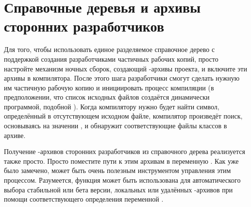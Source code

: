 \section{Справочные деревья и архивы сторонних %
разработчиков}

Для того, чтобы использовать единое разделяемое справочное дерево с
поддержкой создания разработчиками частичных рабочих копий, просто
настройте механизм ночных сборок, создающий \Java{}\hyp{}архивы
проекта, и включите эти архивы в  компилятора.
После этого шага разработчики смогут сделать нужную им частичную
рабочую копию и инициировать процесс компиляции (в предположении, что
список исходных файлов создаётся динамически программой, подобной
). Когда компилятору \Java{} нужно будет найти символ,
определённый в отсутствующем исходном файле, компилятор произведёт
поиск, основываясь на значении , и обнаружит
соответствующие файлы классов в архиве.

Получение \Java{}\hyp{}архивов сторонних разработчиков из справочного
дерева реализуется также просто. Просто поместите пути к этим архивам
в переменную . Как уже было замечено, \Makefile{}
может быть очень полезным инструментом управления этим процессом.
Разумеется, функция  может быть использована
для автоматического выбора стабильной или бета версии, локальных или
удалённых \Java{}\hyp{}архивов при помощи соответствующего определения
переменной .

